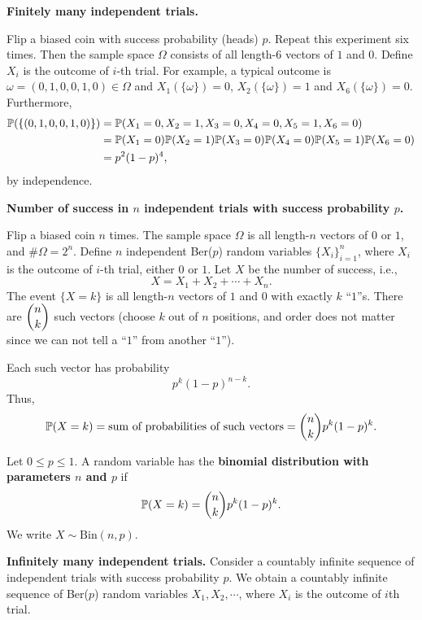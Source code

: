 \textbf{Finitely many independent trials.}
\begin{example}
  Flip a biased coin with success probability (heads) $p$. Repeat this
  experiment six times. Then the sample space $\Omega$ consists of all
  length-$6$ vectors of $1$ and $0$. Define $X_i$ is the outcome of $i$-th
  trial. For example, a typical outcome is $\omega = (0,1,0,0,1,0)\in \Omega$ and
  $X_1(\{\omega\}) = 0$, $X_2(\{\omega\}) = 1$ and $X_6(\{\omega\}) = 0$.
  Furthermore,
  \begin{align*}
    \mathbb{P}(\{(0,1,0,0,1,0)\}) & = \mathbb{P}(X_1 =0, X_2 =1, X_3 = 0, X_4 =0, X_5 =1, X_6 =0)\\
                           & = \mathbb{P}(X_1 = 0)\mathbb{P}(X_2 = 1)\mathbb{P}(X_3 = 0)\mathbb{P}(X_4 = 0)\mathbb{P}(X_5 = 1)\mathbb{P}(X_6 = 0)\\
    & = p^2(1-p)^4,
  \end{align*}
  by independence.
\end{example}
\textbf{Number of success in $n$ independent trials with success probability $p$.}
\begin{example}
  Flip a biased coin $n$ times. The sample space $\Omega$ is all length-$n$
  vectors of $0$ or $1$, and $\# \Omega = 2^n$. Define $n$ independent Ber($p$) random variables
  $\{X_i\}_{i=1}^n$, where $X_i$ is the outcome of $i$-th trial, either $0$ or $1$. Let $X$ be the
  number of success, i.e.,
  \[
    X = X_1 + X_2+\cdots + X_n.
  \]
  The event $\{X = k\}$ is all length-$n$ vectors of $1$ and $0$ with exactly
  $k$ ``$1$''s. There are $\displaystyle \binom{n}{k}$ such vectors (choose $k$ out of $n$
  positions, and order does not matter since we can not tell a ``$1$'' from
  another ``$1$'').

  Each such vector has probability
  \[
    p^k(1-p)^{n-k}.
  \]
  Thus,
  \[
    \mathbb{P}(X = k) = \text{sum of probabilities of such vectors} = \binom{n}{k}p^k(1-p)^k.
  \]
\end{example}
\begin{definition}
  Let $0\le p\le 1$. A random variable has the \textbf{binomial distribution
    with parameters $n$ and $p$} if
  \[
    \mathbb{P}(X = k) = \binom{n}{k}p^k(1-p)^k.
  \]
  We write $X\sim\text{Bin}(n,p)$.
\end{definition}




\textbf{Infinitely many independent trials.} Consider a countably infinite
sequence of independent trials with success probability $p$. We obtain a
countably infinite sequence of Ber($p$) random variables $X_1, X_2,\cdots$,
where $X_i$ is the outcome of $i$th trial.























